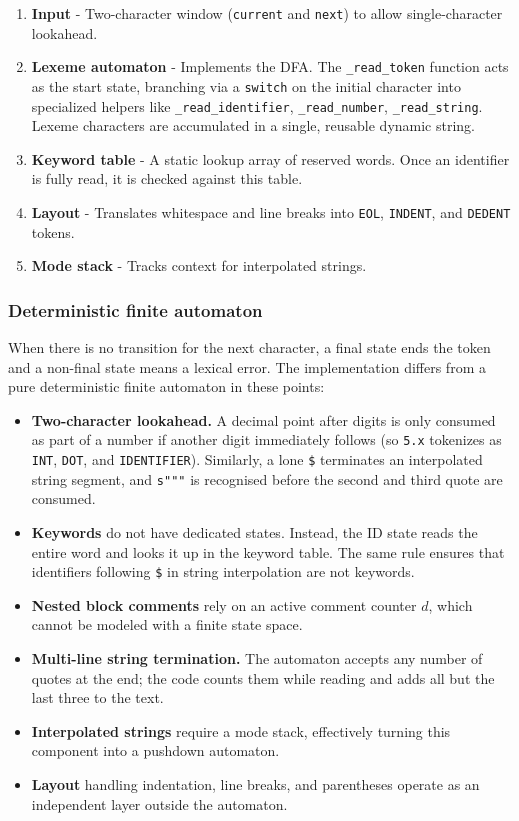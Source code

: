 \documentclass[a4paper]{article}
\begin{document}
\begin{enumerate}
    \item \textbf{Input} - Two-character window (\texttt{current} and \texttt{next}) to allow single-character lookahead.
    \item \textbf{Lexeme automaton} - Implements the DFA. The \texttt{\_read\_token} function acts as the start state, branching via a \texttt{switch} on the initial character into specialized helpers like \texttt{\_read\_identifier}, \texttt{\_read\_number}, \texttt{\_read\_string}. Lexeme characters are accumulated in a single, reusable dynamic string.
    \item \textbf{Keyword table} - A static lookup array of reserved words. Once an identifier is fully read, it is checked against this table.
    \item \textbf{Layout} - Translates whitespace and line breaks into \texttt{EOL}, \texttt{INDENT}, and \texttt{DEDENT} tokens.
    \item \textbf{Mode stack} - Tracks context for interpolated strings.
\end{enumerate}

\subsubsection{Deterministic finite automaton}
When there is no transition for the next character, a final state ends the token and a non-final state means a lexical error. The implementation differs from a pure deterministic finite automaton in these points:

\begin{itemize}
    \item \textbf{Two-character lookahead.} A decimal point after digits is only consumed as part of a number if another digit immediately follows (so \texttt{5.x} tokenizes as \texttt{INT}, \texttt{DOT}, and \texttt{IDENTIFIER}). Similarly, a lone \texttt{\$} terminates an interpolated string segment, and \texttt{s"""} is recognised before the second and third quote are consumed.
    \item \textbf{Keywords} do not have dedicated states. Instead, the ID state reads the entire word and looks it up in the keyword table. The same rule ensures that identifiers following \texttt{\$} in string interpolation are not keywords.
    \item \textbf{Nested block comments} rely on an active comment counter $d$, which cannot be modeled with a finite state space.
    \item \textbf{Multi-line string termination.} The automaton accepts any number of quotes at the
      end; the code counts them while reading and adds all but the last three to the text.
    \item \textbf{Interpolated strings} require a mode stack, effectively turning this component into a pushdown automaton.
    \item \textbf{Layout} handling indentation, line breaks, and parentheses operate as an independent layer outside the automaton.
\end{itemize}
\end{document}

